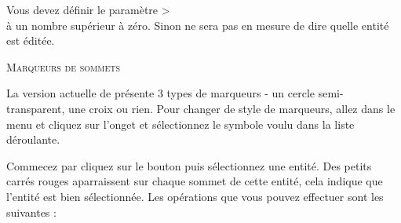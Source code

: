 Vous devez définir le paramètre > \\ \arrow {} \arrow {} à un nombre supérieur à zéro. Sinon \qg ne sera pas en mesure de dire quelle entité est éditée.

\begin{Tip}[ht]\caption{\textsc{Marqueurs de sommets}}
La version actuelle de \qg présente 3 types de marqueurs - un cercle semi-transparent, une croix ou rien. Pour changer de style de marqueurs, allez dans le menu  et cliquez sur l'onget  et sélectionnez le symbole voulu dans la liste déroulante.
\end{Tip}


Commecez par cliquez sur le bouton  puis sélectionnez une entité. Des petits carrés rouges aparraissent sur chaque sommet de cette entité, cela indique que l'entité est bien sélectionnée. Les opérations que vous pouvez effectuer sont les suivantes :

